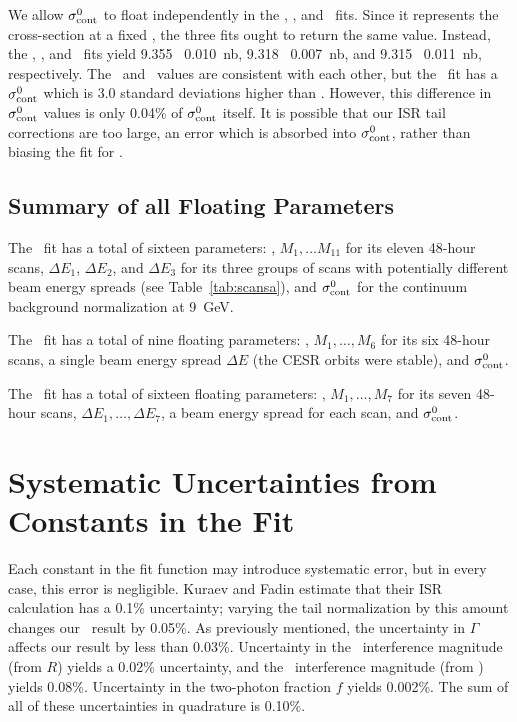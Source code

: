 \documentclass{cornell}
\begin{document}
We allow $\sigma_{\mbox{\scriptsize cont}}^0$ to float independently in the \us,
\uss, and \usss\ fits.  Since it represents the cross-section at a
fixed \ecm, the three fits ought to return the same value.  Instead,
the \us, \uss, and \usss\ fits yield 9.355 \PM\ 0.010~nb, 9.318 \PM\
0.007~nb, and 9.315 \PM\ 0.011~nb, respectively.  The \uss\ and \usss\
values are consistent with each other, but the \us\ fit has a
$\sigma_{\mbox{\scriptsize cont}}^0$ which is 3.0 standard deviations higher than
\uss.  However, this difference in $\sigma_{\mbox{\scriptsize cont}}^0$ values is
only 0.04\% of $\sigma_{\mbox{\scriptsize cont}}^0$ itself.  It is possible that our
ISR tail corrections are too large, an error which is absorbed into
$\sigma_{\mbox{\scriptsize cont}}^0$, rather than biasing the fit for \geehadtot.

\subsection{Summary of all Floating Parameters}

The \us\ fit has a total of sixteen parameters: \geehadtot, $M_1,
\ldots M_{11}$ for its eleven 48-hour scans, $\Delta E_1$, $\Delta
E_2$, and $\Delta E_3$ for its three groups of scans with potentially
different beam energy spreads (see Table~\ref{tab:scansa}), and
$\sigma_{\mbox{\scriptsize cont}}^0$ for the continuum background normalization at
9~GeV.

The \uss\ fit has a total of nine floating parameters: \geehadtot,
$M_1, \ldots, M_6$ for its six 48-hour scans, a single beam energy
spread $\Delta E$ (the CESR orbits were stable), and
$\sigma_{\mbox{\scriptsize cont}}^0$.

The \usss\ fit has a total of sixteen floating parameters: \geehadtot,
$M_1, \ldots, M_7$ for its seven 48-hour scans, $\Delta E_1,
\ldots, \Delta E_7$, a beam energy spread for each scan, and
$\sigma_{\mbox{\scriptsize cont}}^0$.

\section{Systematic Uncertainties from Constants in the Fit}
\label{sec:lineshapesyst}

Each constant in the fit function may introduce systematic error, but
in every case, this error is negligible.  Kuraev and Fadin estimate
that their ISR calculation has a 0.1\% uncertainty; varying the tail
normalization by this amount changes our \geehadtot\ result by 0.05\%.
As previously mentioned, the uncertainty in $\Gamma$ affects our result
by less than 0.03\%.  Uncertainty in the \qqbar\ interference
magnitude (from $R$) yields a 0.02\% uncertainty, and the \tautau\
interference magnitude (from \btt) yields 0.08\%.  Uncertainty in the
two-photon fraction $f$ yields 0.002\%.  The sum of all of these
uncertainties in quadrature is 0.10\%.
\end{document}
